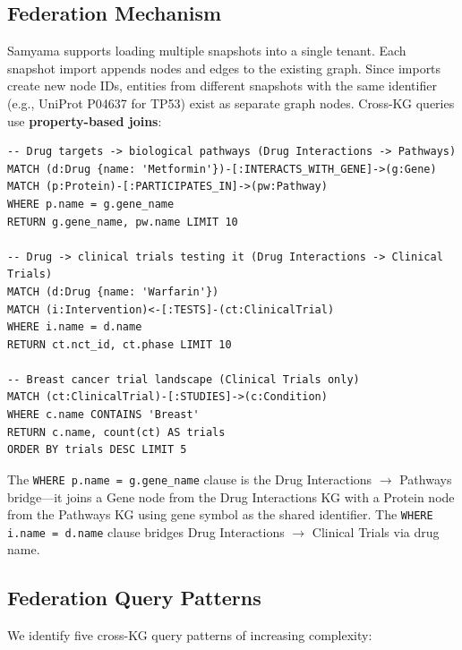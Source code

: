 \documentclass[11pt]{article}
\begin{document}
\subsection{Federation Mechanism}

Samyama supports loading multiple snapshots into a single tenant. Each snapshot import appends nodes and edges to the existing graph. Since imports create new node IDs, entities from different snapshots with the same identifier (e.g., UniProt P04637 for TP53) exist as separate graph nodes. Cross-KG queries use \textbf{property-based joins}:

\begin{lstlisting}
-- Drug targets -> biological pathways (Drug Interactions -> Pathways)
MATCH (d:Drug {name: 'Metformin'})-[:INTERACTS_WITH_GENE]->(g:Gene)
MATCH (p:Protein)-[:PARTICIPATES_IN]->(pw:Pathway)
WHERE p.name = g.gene_name
RETURN g.gene_name, pw.name LIMIT 10

-- Drug -> clinical trials testing it (Drug Interactions -> Clinical Trials)
MATCH (d:Drug {name: 'Warfarin'})
MATCH (i:Intervention)<-[:TESTS]-(ct:ClinicalTrial)
WHERE i.name = d.name
RETURN ct.nct_id, ct.phase LIMIT 10

-- Breast cancer trial landscape (Clinical Trials only)
MATCH (ct:ClinicalTrial)-[:STUDIES]->(c:Condition)
WHERE c.name CONTAINS 'Breast'
RETURN c.name, count(ct) AS trials
ORDER BY trials DESC LIMIT 5
\end{lstlisting}

The \texttt{WHERE p.name = g.gene\_name} clause is the Drug Interactions $\to$ Pathways bridge---it joins a Gene node from the Drug Interactions KG with a Protein node from the Pathways KG using gene symbol as the shared identifier. The \texttt{WHERE i.name = d.name} clause bridges Drug Interactions $\to$ Clinical Trials via drug name.

\subsection{Federation Query Patterns}

We identify five cross-KG query patterns of increasing complexity:
\end{document}
